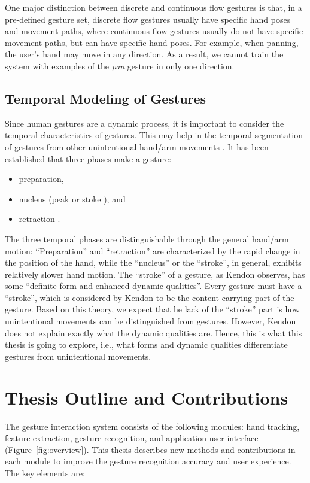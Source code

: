 One major distinction between discrete and continuous flow gestures is that,
in a pre-defined gesture set, discrete flow gestures usually have specific hand
poses and movement paths, where continuous flow gestures usually do not have
specific movement paths, but can have specific hand poses.
For example, when panning, the user's hand may move in any
direction. As a result, 
 we cannot train the system with examples of  the
\textit{pan} gesture in only one direction.

\subsection{Temporal Modeling of Gestures}
Since human gestures are a dynamic process, it is important to consider the
temporal characteristics of gestures. This may help in the temporal segmentation
of gestures from other unintentional hand/arm movements \cite{Pavlovic97}. It
has been established that three phases make a gesture:
\begin{itemize}
  \item preparation,
  \item nucleus (peak or stoke \cite{mcneill82}), and
  \item retraction \cite{Pavlovic97}.
\end{itemize}
The three temporal phases are distinguishable through the general hand/arm
motion: ``Preparation'' and ``retraction'' are characterized by the rapid change
in the position of the hand, while the ``nucleus'' or the ``stroke'', in
general, exhibits relatively slower hand motion. The ``stroke'' of a gesture, as
Kendon \cite{kendon86} observes, has some ``definite form and enhanced dynamic
qualities''. Every gesture must have a ``stroke'', which is considered by Kendon
to be the content-carrying part of the gesture. Based on this theory, we
expect that he lack of the ``stroke'' part is how unintentional movements can
be distinguished from gestures. However, Kendon does not explain exactly what
the dynamic qualities are. Hence, this is what this thesis is going to explore, i.e., what forms and dynamic qualities differentiate gestures from unintentional movements.

\section{Thesis Outline and Contributions}
The gesture interaction system consists of the following modules: hand tracking, 
feature extraction, gesture recognition, and application user interface
(Figure~\ref{fig:overview}). This thesis describes new methods and
contributions in each module to improve the gesture recognition accuracy and
user experience. The key elements are:

